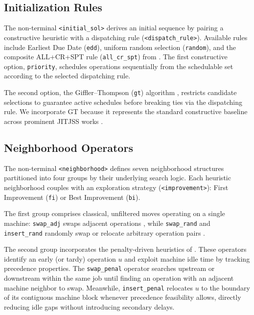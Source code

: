 \subsection{Initialization Rules}
\label{subsec:initialization_rules}

The non-terminal \texttt{<initial\_sol>} derives an initial sequence by pairing a constructive heuristic with a dispatching rule (\texttt{<dispatch\_rule>}).
Available rules include Earliest Due Date (\texttt{edd}), uniform random selection (\texttt{random}), and the composite ALL+CR+SPT rule (\texttt{all\_cr\_spt}) from \citet{wang2014variable}.
The first constructive option, \texttt{priority}, schedules operations sequentially from the schedulable set according to the selected dispatching rule.

The second option, the Giffler--Thompson (\texttt{gt}) algorithm \citep{giffler1960algorithms}, restricts candidate selections to guarantee active schedules before breaking ties via the dispatching rule.
We incorporate GT because it represents the standard constructive baseline across prominent JITJSS works \citep{ahmadian2021meta, abderrazzak2022adaptive, sabri2023reinforcement}.

\subsection{Neighborhood Operators} 
\label{subsec:neighborhood_operators}

The non-terminal \texttt{<neighborhood>} defines seven neighborhood structures partitioned into four groups by their underlying search logic. Each heuristic neighborhood couples with an exploration strategy (\texttt{<improvement>}): First Improvement (\texttt{fi}) or Best Improvement (\texttt{bi}).

The first group comprises classical, unfiltered moves operating on a single machine: \texttt{swap\_adj} swaps adjacent operations \citep{dos2010combination}, while \texttt{swap\_rand} and \texttt{insert\_rand} randomly swap or relocate arbitrary operation pairs \citep{ahmadian2021meta}.

The second group incorporates the penalty-driven heuristics of \citet{wang2014variable}. These operators identify an early (or tardy) operation $u$ and exploit machine idle time by tracking precedence properties. The \texttt{swap\_penal} operator searches upstream or downstream within the same job until finding an operation with an adjacent machine neighbor to swap. Meanwhile, \texttt{insert\_penal} relocates $u$ to the boundary of its contiguous machine block whenever precedence feasibility allows, directly reducing idle gaps without introducing secondary delays.

